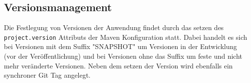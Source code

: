 \subsection{Versionsmanagement}
Die Festlegung von Versionen der Anwendung findet durch das setzen des \texttt{project.version} Attributs der Maven Konfiguration statt. Dabei handelt es sich bei Versionen mit dem Suffix "SNAPSHOT" um Versionen in der Entwicklung (vor der Veröffentlichung) und bei Versionen ohne das Suffix um feste und nicht mehr veränderte Versionen. Neben dem setzen der Version wird ebenfalls ein synchroner Git Tag angelegt.

